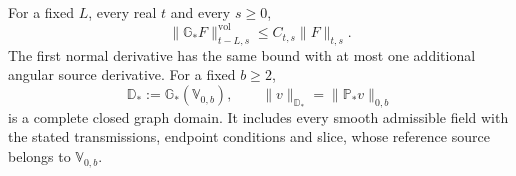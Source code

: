 \begin{lemma}
\label{lem:two-weights-closed-domain}
For a fixed $L$, every real $t$ and every $s\ge0$,
\begin{equation}\label{eq:reference-negative-material-extension}
 \|\mathbb G_*F\|^{\mathrm{vol}}_{t-L,s}
                       \le C_{t,s}\|F\|_{t,s}.
\end{equation}
The first normal derivative has the same bound with at most one
additional angular source derivative. For a fixed $b\ge2$,
\begin{equation}\label{eq:fixed-base-graph-domain}
 \mathbb D_*:=\mathbb G_*(\mathbb V_{0,b}),\qquad
 \|v\|_{\mathbb D_*}=\|\mathbb P_*v\|_{0,b}
\end{equation}
is a complete closed graph domain. It includes every smooth admissible
field with the stated transmissions, endpoint conditions and slice,
whose reference source belongs to $\mathbb V_{0,b}$.
\end{lemma}

